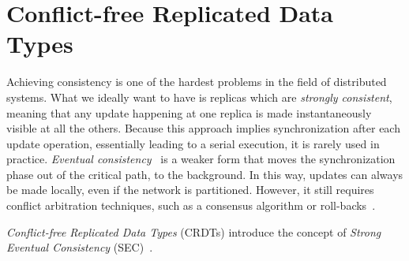 \section{Conflict-free Replicated Data Types}
\label{sec:crdts}


Achieving consistency is one of the hardest problems in the field of distributed
systems. What we ideally want to have is replicas which are \textit{strongly
consistent}, meaning that any update happening at one replica is made
instantaneously visible at all the others. Because this approach implies
synchronization after each update operation, essentially leading to a serial
execution, it is rarely used in practice. \textit{Eventual
consistency}~\cite{DBLP:journals/queue/Vogels08a,Saito:2005:OR:1057977.1057980}
is a weaker form that moves the synchronization phase out of the critical path,
to the background. In this way, updates can always be made locally, even if the
network is partitioned. However, it still requires conflict arbitration
techniques, such as a consensus algorithm or
roll-backs~\cite{Terry:1995:MUC:224056.224070}.

\textit{Conflict-free Replicated Data Types} (CRDTs) introduce the concept of
\textit{Strong Eventual Consistency}
(SEC)~\cite{Shapiro:2011:CRD:2050613.2050642}.
